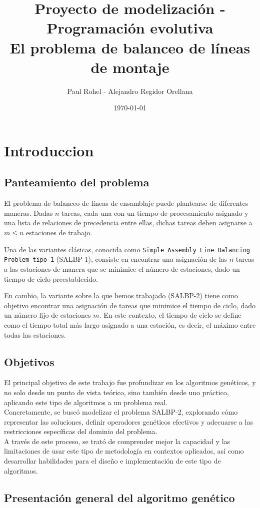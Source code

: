\documentclass[12pt,a4paper]{report}
\title{Proyecto de modelización - Programación evolutiva\\ \textbf{El problema de balanceo de líneas de montaje}}
\author{Paul Rohel - Alejandro Regidor Orellana}
\date{\today}
\begin{document}
\maketitle
\tableofcontents

\chapter{Introduccion}
\section{Panteamiento del problema}
El problema de balanceo de líneas de ensamblaje puede plantearse de diferentes maneras. Dadas $n$ tareas, cada una con un tiempo de procesamiento asignado y una lista de relaciones de precedencia entre ellas, dichas tareas deben asignarse a $m \leq n$ estaciones de trabajo.

Una de las variantes clásicas, conocida como \texttt{Simple Assembly Line Balancing Problem tipo 1} (SALBP-1), consiste en encontrar una asignación de las $n$ tareas a las estaciones de manera que se minimice el número de estaciones, dado un tiempo de ciclo preestablecido.

En cambio, la variante sobre la que hemos trabajado (SALBP-2) tiene como objetivo encontrar una asignación de tareas que minimice el tiempo de ciclo, dado un número fijo de estaciones $m$. En este contexto, el tiempo de ciclo se define como el tiempo total más largo asignado a una estación, es decir, el máximo entre todas las estaciones.

\section{Objetivos}
El principal objetivo de este trabajo fue profundizar en los algoritmos genéticos, y no solo desde un punto de vista teórico, sino también desde uno práctico, aplicando este tipo de algoritmos a un problema real.\\
Concretamente, se buscó modelizar el problema SALBP-2, explorando cómo representar las soluciones, definir operadores genéticos efectivos y adecuarse a las restricciones específicas del dominio del problema.\\
A través de este proceso, se trató de comprender mejor la capacidad y las limitaciones de usar este tipo de metodología en contextos aplicados, así como desarrollar habilidades para el diseño e implementación de este tipo de algoritmos.

\section{Presentación general del algoritmo genético}
\end{document}
